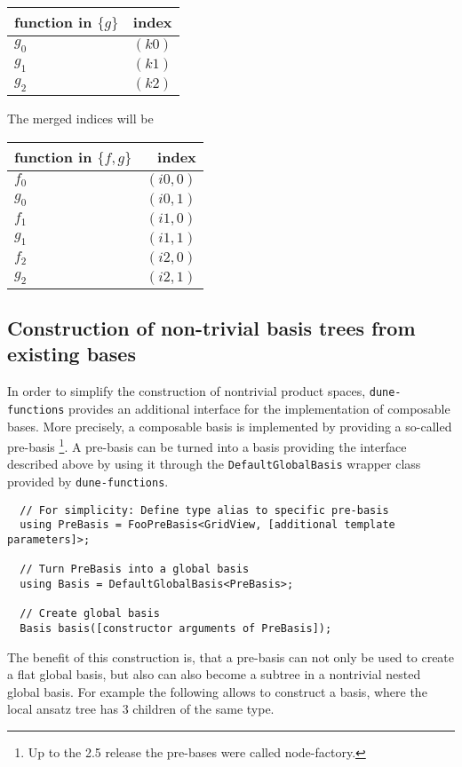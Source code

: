 \documentclass[a4paper,10pt,headings=normal,bibliography=totoc]{scrartcl}
\newcommand{\cpp}[1]{\lstinline[basicstyle=\ttfamily]!#1!}
\newcommand{\dunemodule}[1]{\texttt{#1}}
\begin{document}
\begin{tabular}{l|r}
   function in $\{g\}$ & index \\
   \hline
   $g_0$  & $(k0)$ \\
   $g_1$  & $(k1)$ \\
   $g_2$  & $(k2)$
\end{tabular}

The merged indices will be

\begin{tabular}{l|r}
   function in $\{f,g\}$ & index \\
   \hline
   $f_0$  & $(i0,0)$ \\
   $g_0$  & $(i0,1)$ \\
   $f_1$  & $(i1,0)$ \\
   $g_1$  & $(i1,1)$ \\
   $f_2$  & $(i2,0)$ \\
   $g_2$  & $(i2,1)$
\end{tabular}


\subsection{Construction of non-trivial basis trees from existing bases}
In order to simplify the construction of nontrivial product spaces,
\dunemodule{dune-functions} provides an additional interface for the
implementation of composable bases. More precisely, a composable
basis is implemented by providing a so-called pre-basis
\footnote{Up to the 2.5 release the pre-bases were called node-factory.}.
A pre-basis can be
turned into a basis providing the interface described above by
using it through the \cpp{DefaultGlobalBasis} wrapper class
provided by \dunemodule{dune-functions}.

\begin{lstlisting}
  // For simplicity: Define type alias to specific pre-basis
  using PreBasis = FooPreBasis<GridView, [additional template parameters]>;

  // Turn PreBasis into a global basis
  using Basis = DefaultGlobalBasis<PreBasis>;

  // Create global basis
  Basis basis([constructor arguments of PreBasis]);
\end{lstlisting}

The benefit of this construction is, that a pre-basis can not
only be used to create a flat global basis, but also can also
become a subtree in a nontrivial nested global basis. For example
the following allows to construct a basis, where the local ansatz
tree has 3 children of the same type.
\end{document}
